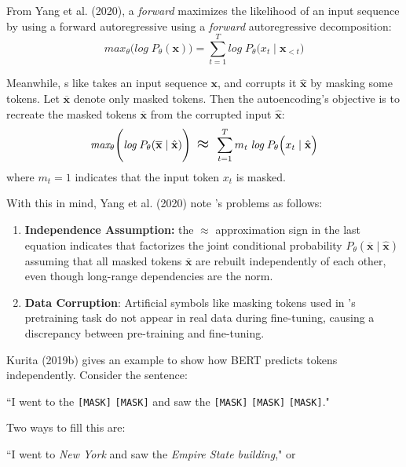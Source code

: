 From Yang et al. (2020), a \emph{forward}  maximizes the likelihood of an input sequence by using a forward autoregressive using a \emph{forward} autoregressive decomposition: 
$$
\textit{max}_\theta \Bigg( \textit{log}  \; P_\theta(\textbf{x})  \Bigg) = \sum_{t=1}^T \textit{log} \; P_\theta \Big(x_t \; | \; \textbf{x}_{< t} \Big)  
$$

Meanwhile, s like  takes an input sequence $\textbf{x}$, and corrupts it $\hat{\textbf{x}}$ by masking some tokens. Let $\overline{\textbf{x}}$ denote only masked tokens. Then the autoencoding's objective is to recreate the masked tokens $\overline{\textbf{x}}$ from the corrupted input $\hat{\textbf{x}}$: 
$$
\textit{max}_\theta \Bigg( \textit{log}  \; P_\theta(\overline{\textbf{x}} \; | \; \hat{\textbf{x}})  \Bigg) \;\; \mathlarger{\mathlarger{\approx}} \;\; \sum_{t=1}^T m_t \; \textit{log} \; P_\theta \Big(x_t \; | \; \hat{\textbf{x}} \Big) 
$$
where $m_t = 1$ indicates that the input token $x_t$ is masked. 

With this in mind, Yang et al. (2020) note 's problems as follows: 
\begin{enumerate}
    \item \textbf{Independence Assumption: } the $\approx$ approximation sign in the last equation indicates that  factorizes the joint conditional probability $P_\theta(\overline{\textbf{x}} \; | \; \hat{\textbf{x}})$ assuming that all masked tokens $\overline{\textbf{x}}$ are rebuilt independently of each other, even though long-range dependencies are the norm. 
    
    \item \textbf{Data Corruption}: Artificial symbols like masking tokens used in 's pretraining  task do not appear in real data during fine-tuning, causing a discrepancy between pre-training and fine-tuning. 
\end{enumerate}

Kurita (2019b) gives an example to show how BERT predicts tokens independently. Consider the sentence: 

``I went to the \texttt{[MASK]} \texttt{[MASK]} and saw the \texttt{[MASK]} \texttt{[MASK]} \texttt{[MASK]}." 

Two ways to fill this are: 

``I went to \emph{New York} and saw the \textit{Empire State building}," or

